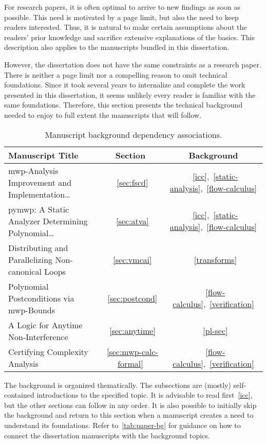 For research papers, it is often optimal to arrive to new findings as soon as
possible. This need is motivated by a page limit, but also the need to keep
readers interested. Thus, it is natural to make certain assumptions about the
readers' prior knowledge and sacrifice extensive explanations of the basics.
This description also applies to the manuscripts bundled in this dissertation.

However, the dissertation does not have the same constraints as a research
paper. There is neither a page limit nor a compelling reason to omit technical
foundations. Since it took several years to internalize and complete the work
presented in this dissertation, it seems unlikely every reader is familiar with
the same foundations. Therefore, this section presents the technical background
needed to enjoy to full extent the manuscripts that will follow.

\begin{table}[h!]
\begin{NiceTabularX}{\linewidth}{@{}Xcc@{}}
\toprule
\textbf{Manuscript Title} & \textbf{Section} & \textbf{Background} \\
\midrule
{mwp-Analysis Improvement and Implementation\ldots}
    &~\ref{sec:fscd}
    &~\ref{icc},~\ref{static-analysis},~\ref{flow-calculus} \\
{pymwp: A Static Analyzer Determining Polynomial\ldots}
    &~\ref{sec:atva}
    &~\ref{icc},~\ref{static-analysis},~\ref{flow-calculus} \\
{Distributing and Parallelizing Non-canonical Loops}
    &~\ref{sec:vmcai}
    &~\ref{transforms} \\
{Polynomial Postconditions via mwp-Bounds}
    &~\ref{sec:postcond}
    &~\ref{flow-calculus},~\ref{verification} \\
{A Logic for Anytime Non-Interference}
    &~\ref{sec:anytime}
    &~\ref{pl-sec} \\
{Certifying Complexity Analysis}
    &~\ref{sec:mwp-calc-formal}
    &~\ref{flow-calculus},~\ref{verification} \\
\bottomrule
\end{NiceTabularX}
\caption[Manuscript background dependency associations]
{Manuscript background dependency associations.}
\label{tab:paper-bg}
\end{table}

The background is organized thematically. The subsections are (mostly)
self-contained introductions to the specified topic. It is advisable to read
first~\autoref{icc}, but the other sections can follow in any order. It is also
possible to initially skip the background and return to this section when a
manuscript creates a need to understand its foundations. Refer
to~\autoref{tab:paper-bg} for guidance on how to connect the dissertation
manuscripts with the background topics.
